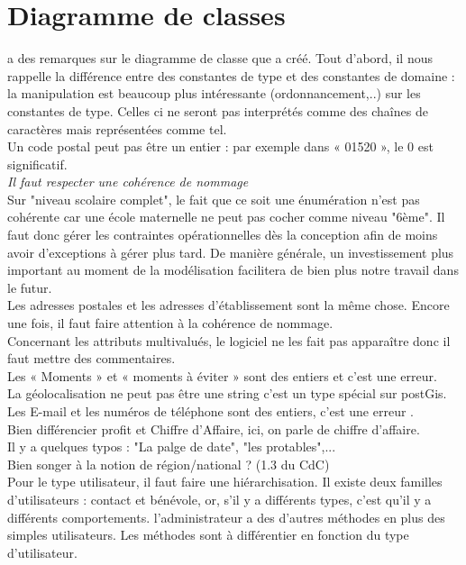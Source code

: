 \documentclass [a4paper] {article}
\begin{document}
\section{Diagramme de classes}
\nomTuteurPedago{} a des remarques sur le diagramme de classe que \Julie{} a créé. Tout d'abord, il nous rappelle la différence entre des constantes de type et des constantes de domaine : la manipulation est beaucoup plus intéressante (ordonnancement,..) sur les constantes de type. Celles ci ne seront pas interprétés comme des chaînes de caractères mais représentées comme tel. \\
Un code postal peut pas être un entier : par exemple dans « 01520 », le 0 est significatif. \\
\emph{Il faut respecter une cohérence de nommage} \\
Sur "niveau scolaire complet", le fait que ce soit une énumération n'est pas cohérente car une école maternelle ne peut pas cocher comme niveau "6ème". Il faut donc gérer les contraintes opérationnelles dès la conception afin de moins avoir d'exceptions à gérer plus tard. De manière générale, un investissement plus important au moment de la modélisation facilitera de bien plus notre travail dans le futur. \\
Les adresses postales et les adresses d’établissement sont la même chose. Encore une fois, il faut faire attention à la cohérence de nommage.\\
Concernant les attributs multivalués, le logiciel ne les fait pas apparaître donc il faut mettre des commentaires.\\
Les « Moments » et « moments à éviter » sont des entiers et c'est une erreur. \\
La géolocalisation ne peut pas être une string c'est un type spécial sur postGis.\\
Les E-mail et les numéros de téléphone sont des entiers, c'est une erreur .\\
Bien différencier profit et Chiffre d'Affaire, ici, on parle de chiffre d'affaire.\\
Il y a quelques typos : "La palge de date", "les protables",...\\
Bien songer à la notion de région/national ? (1.3 du CdC) \\
Pour le type utilisateur, il faut faire une hiérarchisation. Il existe deux familles d'utilisateurs : contact et bénévole, or, s'il y a différents types, c'est qu'il y a différents comportements. l'administrateur a des d'autres méthodes en plus des simples utilisateurs. Les méthodes sont à différentier en fonction du type d'utilisateur.
\end{document}
